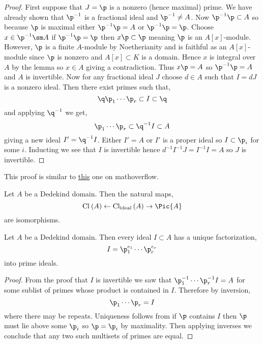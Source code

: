 \documentclass[12pt]{article}
\begin{document}
\begin{proof}
First suppose that $J = \p$ is a nonzero (hence maximal) prime. We have already shown that $\p^{-1}$ is a fractional ideal and $\p^{-1} \neq A$. Now $\p^{-1} \p \subset A$ so because $\p$ is maximal either $\p^{-1} \p = A$ or $\p^{-1} \p = \p$. Choose $x \in \p^{-1} \sm A$ if $\p^{-1} \p = \p$ then $x \p \subset \p$ meaning $\p$ is an $A[x]$-module. However, $\p$ is a finite $A$-module by Noetherianity and is faithful as an $A[x]$-module since $\p$ is nonzero and $A[x] \subset K$ is a domain. Hence $x$ is integral over $A$ by the lemma so $x \in A$ giving a contradiction. Thus $x \p = A$ so $\p^{-1} \p = A$ and $A$ is invertible. Now for any fractional ideal $J$ choose $d \in A$ such that $I = d J$ is a nonzero ideal. Then there exist primes such that,
\[ \q \p_1 \cdots \p_r \subset I \subset \q \]
and applying $\q^{-1}$ we get,
\[ \p_1 \cdots \p_{r} \subset \q^{-1} I \subset A \]
giving a new ideal $I' = \q^{-1} I$. Either $I' = A$ or $I'$ is a proper ideal so $I \subset \p_i$ for some $i$. Inducting we see that $I$ is invertible hence $d^{-1} I^{-1} J = I^{-1} I = A$ so $J$ is invertible. 
\end{proof}

\begin{rmk}
This proof is similar to \href{https://math.stackexchange.com/questions/188585/localizations-of-dedekind-domains-are-discrete-valuation-rings}{this} one on mathoverflow.
\end{rmk}

\begin{cor}
Let $A$ be a Dedekind domain. Then the natural maps,
\[ \Cl{A} \leftarrow \Cl[\text{ideal}]{A} \to \Pic{A} \]
are isomorphisms.
\end{cor}

\begin{thm}
Let $A$ be a Dedekind domain. Then every ideal $I \subset A$ has a unique factorization,
\[ I = \p_1^{e_1} \cdots \p_r^{e_r} \]
into prime ideals.
\end{thm}

\begin{proof}
From the proof that $I$ is invertible we saw that $\p_1^{-1} \cdots \p_r^{-1} I = A$ for some sublist of primes whose product is contained in $I$. Therefore by inversion,
\[ \p_1 \cdots \p_r = I \]
where there may be repeats. Uniqueness follows from if $\p$ contains $I$ then $\p$ must lie above some $\p_i$ so $\p = \p_i$ by maximality. Then applying inverses we conclude that any two such multisets of primes are equal. 
\end{proof}
\end{document}
